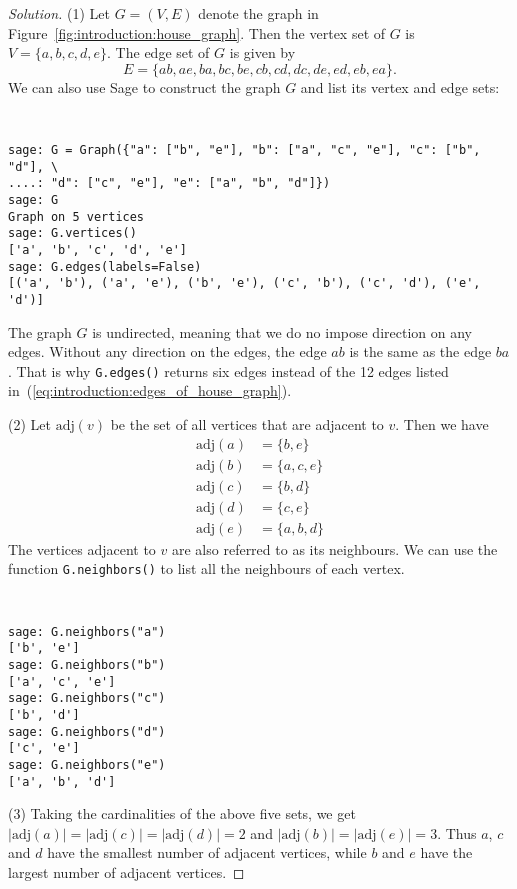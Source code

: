 \begin{proof}[Solution]
(1) Let $G = (V, E)$ denote the graph in
Figure~\ref{fig:introduction:house_graph}. Then the vertex set of $G$
is $V = \{ a, b, c, d, e \}$. The edge set of $G$ is given by
\begin{equation}
\label{eq:introduction:edges_of_house_graph}
E
=
\{ ab, ae, ba, bc, be, cb, cd, dc, de, ed, eb, ea \}.
\end{equation}
We can also use Sage to construct the graph $G$ and list its vertex
and edge sets:
%
\begin{center}
\fontsize{10pt}{10pt}
\selectfont
\tt
\begin{lstlisting}
sage: G = Graph({"a": ["b", "e"], "b": ["a", "c", "e"], "c": ["b", "d"], \
....: "d": ["c", "e"], "e": ["a", "b", "d"]})
sage: G
Graph on 5 vertices
sage: G.vertices()
['a', 'b', 'c', 'd', 'e']
sage: G.edges(labels=False)
[('a', 'b'), ('a', 'e'), ('b', 'e'), ('c', 'b'), ('c', 'd'), ('e', 'd')]
\end{lstlisting}
\end{center}
%
The graph $G$ is undirected, meaning that we do no impose direction on
any edges. Without any direction on the edges, the edge $ab$ is the
same as the edge $ba$. That is why \texttt{G.edges()} returns six
edges instead of the 12 edges listed
in~(\ref{eq:introduction:edges_of_house_graph}).

(2) Let $\text{adj}(v)$ be the set of all vertices that are adjacent
to $v$. Then we have
%
\begin{align*}
\text{adj}(a) &= \{ b, e \} \\
\text{adj}(b) &= \{ a, c, e \} \\
\text{adj}(c) &= \{ b, d \} \\
\text{adj}(d) &= \{ c, e \} \\
\text{adj}(e) &= \{ a, b, d \}
\end{align*}
%
The vertices adjacent to $v$ are also referred to as its
neighbours. We can use the function \texttt{G.neighbors()} to list all
the neighbours of each vertex.
%
\begin{center}
\fontsize{10pt}{10pt}
\selectfont
\tt
\begin{lstlisting}
sage: G.neighbors("a")
['b', 'e']
sage: G.neighbors("b")
['a', 'c', 'e']
sage: G.neighbors("c")
['b', 'd']
sage: G.neighbors("d")
['c', 'e']
sage: G.neighbors("e")
['a', 'b', 'd']
\end{lstlisting}
\end{center}

(3) Taking the cardinalities of the above five sets, we get
$|\text{adj}(a)| = |\text{adj}(c)| = |\text{adj}(d)| = 2$ and
$|\text{adj}(b)| = |\text{adj}(e)| = 3$. Thus $a$, $c$ and $d$ have
the smallest number of adjacent vertices, while $b$ and $e$ have the
largest number of adjacent vertices.


\end{proof}
